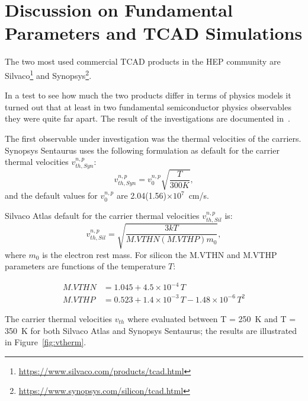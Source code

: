 \section{Discussion on Fundamental Parameters and TCAD Simulations}
\label{sec:TCADfund}
The two most used commercial TCAD products in the HEP community are Silvaco\footnote{\url{https://www.silvaco.com/products/tcad.html}} and Synopsys\footnote{\url{https://www.synopsys.com/silicon/tcad.html}}.

In a test to see how much the two products differ in terms of physics models it turned out 
that at least in two fundamental semiconductor physics observables they were quite far apart. 
The result of the investigations are documented in~\cite{bomben_rd50_Torino}.

The first observable under investigation was the thermal velocities of the carriers. 
Synopsys Sentaurus uses the following formulation as default for the carrier thermal velocities $v_{th,Syn}^{n,p}$:
\begin{equation}
v_{th,Syn}^{n,p} = v_0^{n,p}\sqrt{\dfrac{T}{300 K}},
\label{eq:SynThVel}
\end{equation}
and the default values for $v_0^{n,p}$ are 2.04(1.56)$\times10^{7}$~cm/s.

Silvaco Atlas default for the carrier thermal velocities $v_{th,Sil}^{n,p}$ is:
\begin{equation}
v_{th,Sil}^{n,p} = \sqrt{\dfrac{3kT}{M.VTHN(M.VTHP)m_0}},
\label{eq:SilThVel}
\end{equation}
where $m_0$ is the electron rest mass. 
For silicon the M.VTHN and M.VTHP parameters are functions of the temperature $T$:

\begin{align}
M.VTHN & = 1.045 + 4.5\times10^{-4}\,T\\
M.VTHP & =    0.523 + 1.4 \times10^{-3}\,T -1.48\times10^{-6}\,T^2
\end{align}

The carrier thermal velocities $v_{th}$ where evaluated between T = 250~K and T = 350~K for both 
Silvaco Atlas and Synopsys Sentaurus; 
the results 
are illustrated in Figure~\ref{fig:vtherm}.

